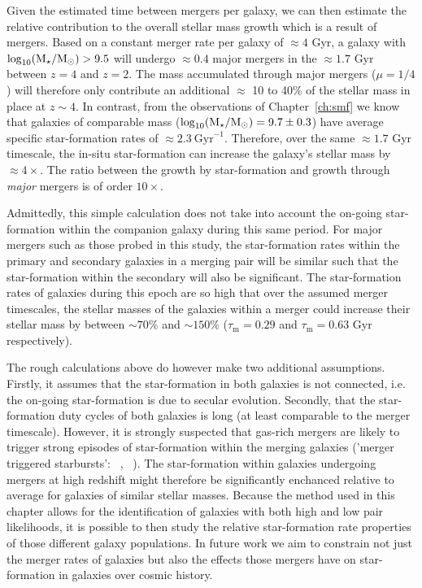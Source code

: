 Given the estimated time between mergers per galaxy, we can then estimate the relative contribution to the overall stellar mass growth which is a result of mergers. Based on a constant merger rate per galaxy of $\approx 4$ Gyr, a galaxy with $\log_{10}(\text{M}_{\star} / \text{M}_{\odot}) > 9.5$ will undergo $\approx 0.4$ major mergers in the $\approx 1.7$ Gyr between $z = 4$ and $z=2$. The mass accumulated through major mergers ($\mu = 1/4$) will therefore only contribute an additional $\approx$ 10 to 40\% of the stellar mass in place at $z\sim4$. In contrast, from the observations of Chapter~\ref{ch:smf} we know that galaxies of comparable mass ($\log_{10}(\text{M}_{\star} / \text{M}_{\odot}) = 9.7 \pm 0.3$) have average specific star-formation rates of $\approx 2.3~\text{Gyr}^{-1}$. Therefore, over the same $\approx 1.7$ Gyr timescale, the in-situ star-formation can increase the galaxy's stellar mass by $\approx 4 \times$. The ratio between the growth by star-formation and growth through \emph{major} mergers is of order $10\times$.

Admittedly, this simple calculation does not take into account the on-going star-formation within the companion galaxy during this same period. For major mergers such as those probed in this study, the star-formation rates within the primary and secondary galaxies in a merging pair will be similar such that the star-formation within the secondary will also be significant. The star-formation rates of galaxies during this epoch are so high that over the assumed merger timescales, the stellar masses of the galaxies within a merger could increase their stellar mass by between $\sim70\%$ and $\sim150\%$ ($\tau_{\text{m}} = 0.29$ and $\tau_{\text{m}} = 0.63$ Gyr respectively).

The rough calculations above do however make two additional assumptions. Firstly, it assumes that the star-formation in both galaxies is not connected, i.e. the on-going star-formation is due to secular evolution. Secondly, that the star-formation duty cycles of both galaxies is long (at least comparable to the merger timescale). However, it is strongly suspected that gas-rich mergers are likely to trigger strong episodes of star-formation within the merging galaxies ('merger triggered starbursts': \citeauthor{Hopkins:2006ju}~\citeyear{Hopkins:2006ju}, \citeauthor{Cox:2008jj}~\citeyear{Cox:2008jj}). The star-formation within galaxies undergoing mergers at high redshift might therefore be significantly enchanced relative to average for galaxies of similar stellar masses. Because the method used in this chapter allows for the identification of galaxies with both high and low pair likelihoods, it is possible to then study the relative star-formation rate properties of those different galaxy populations. In future work we aim to constrain not just the merger rates of galaxies but also the effects those mergers have on star-formation in galaxies over cosmic history.


